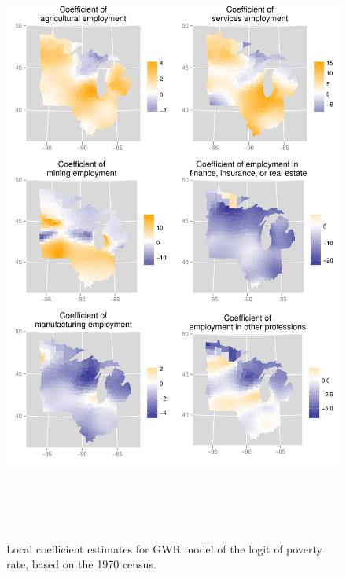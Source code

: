 \documentclass[authoryear, review, 11pt]{elsarticle}
\begin{document}
	\begin{figure}
		\begin{center}
			\includegraphics[height=8in]{../../figures/poverty/1970-GWR-coefficients}
			\caption{Local coefficient estimates for GWR model of the logit of poverty rate, based on the 1970 census. \label{fig:gwr-coefs-1970}}
		\end{center}
	\end{figure}
\end{document}
